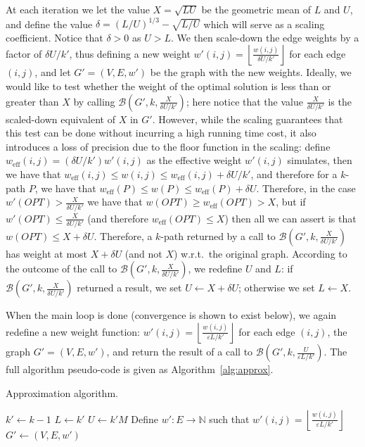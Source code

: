 \documentclass{llncs}
\newcommand{\weff}{w_{\mathrm{eff}}}
\begin{document}
At each iteration we let the value $X=\sqrt{LU}$ be the geometric mean of $L$ and $U$, and define the value $\delta = (L/U)^{1/3}-\sqrt{L/U}$ which will serve as a scaling coefficient. Notice that $\delta > 0$ as $U>L$. We then scale-down the edge weights by a factor of $\delta U / k'$, thus defining a new weight $w'(i,j) = \left\lfloor{\frac{w(i,j)}{\delta U /k'}}\right\rfloor$ for each edge $(i,j)$, and let $G'=(V,E,w')$ be the graph with the new weights. 
Ideally, we would like to test whether the weight of the optimal solution is less than or greater than $X$ by calling $\mathcal{B}(G', k,   \frac{X}{\delta U/k'})$; here notice that the value $\frac{X}{\delta U/k'}$ is the scaled-down equivalent of $X$ in $G'$.
However, while the scaling guarantees that this test can be done without incurring a high running time cost, it also introduces a loss of precision due to the floor function in the scaling: define $\weff(i,j)=(\delta U /k')w'(i,j)$ as the effective weight $w'(i,j)$ simulates, then we have that $\weff(i,j) \leq w(i,j) \leq \weff(i,j) + \delta U /k'$, and therefore for a $k$-path $P$, we have that $\weff(P) \leq w(P) \leq \weff(P) + \delta U$. Therefore, in the case $w'(OPT) >   \frac{X}{\delta U/k'}$ we have that $w(OPT) \geq \weff(OPT) > X$, but if $w'(OPT) \leq   \frac{X}{\delta U/k'}$ (and therefore $\weff(OPT) \leq X$) then all we can assert is that $w(OPT) \leq X + \delta U$.
Therefore, a $k$-path returned by a call to $\mathcal{B}(G', k,   \frac{X}{\delta U/k'})$ has weight at most $X + \delta U$ (and not $X$) w.r.t.\ the original graph. According to the outcome of the call to  $\mathcal{B}(G', k,   \frac{X}{\delta U/k'})$, we redefine $U$ and $L$: if $\mathcal{B}(G', k,   \frac{X}{\delta U/k'})$ returned a result, we set $U \gets X+\delta U$; otherwise we set $L \gets X$. 

When the main loop is done (convergence is shown to exist below), we again redefine a new weight function: $w'(i,j) = \left\lfloor{\frac{w(i,j)}{\varepsilon L /k'}}\right\rfloor$ for each edge $(i,j)$, the graph $G'=(V,E,w')$, and return the result of a call to $\mathcal{B}(G',k,  \frac{U}{\varepsilon L/k'})$. The full algorithm pseudo-code is given as Algorithm~\ref{alg:approx}.


\begin{algorithm}[t]\label{alg:approx}
\caption{Approximation algorithm.}
$k' \gets k-1$\;
$L \gets k'$\;
$U \gets k'M$  \;
Define $w' \colon E \to \mathbb{N}$ such that $w'(i,j) = \left\lfloor{\frac{w(i,j)}{\varepsilon L /k'}}\right\rfloor$\;\label{line:weights-final}
$G' \gets (V,E,w')$\;
\label{line:return}
\end{algorithm}
\end{document}
